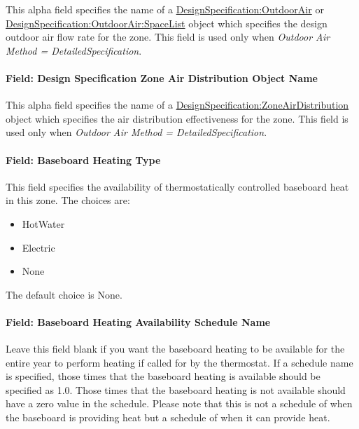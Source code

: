 This alpha field specifies the name of a \hyperref[designspecificationoutdoorair]{DesignSpecification:OutdoorAir} or \hyperref[designspecificationoutdoorairspacelist]{DesignSpecification:OutdoorAir:SpaceList} object which specifies the design outdoor air flow rate for the zone. This field is used only when \emph{Outdoor Air Method = DetailedSpecification}.

\paragraph{Field: Design Specification Zone Air Distribution Object Name}\label{field-design-specification-zone-air-distribution-object-name-4}

This alpha field specifies the name of a \hyperref[designspecificationzoneairdistribution]{DesignSpecification:ZoneAirDistribution} object which specifies the air distribution effectiveness for the zone. This field is used only when \emph{Outdoor Air Method = DetailedSpecification}.

\paragraph{Field: Baseboard Heating Type}\label{field-baseboard-heating-type-4}

This field specifies the availability of thermostatically controlled baseboard heat in this zone. The choices are:

\begin{itemize}
\item
  HotWater
\item
  Electric
\item
  None
\end{itemize}

The default choice is None.

\paragraph{Field: Baseboard Heating Availability Schedule Name}\label{field-baseboard-heating-availability-schedule-name-4}

Leave this field blank if you want the baseboard heating to be available for the entire year to perform heating if called for by the thermostat. If a schedule name is specified, those times that the baseboard heating is available should be specified as 1.0. Those times that the baseboard heating is not available should have a zero value in the schedule. Please note that this is not a schedule of when the baseboard is providing heat but a schedule of when it can provide heat.

